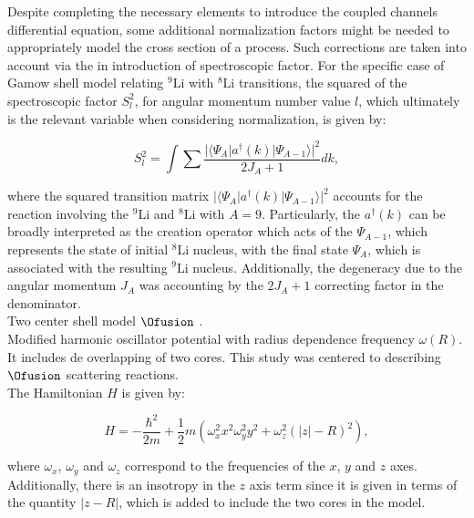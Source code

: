 \documentclass[openany]{book}
\begin{document}
Despite completing the necessary elements to introduce the coupled channels differential equation, some additional normalization factors might be needed to appropriately model the cross section of a process. Such corrections are taken into account via the in introduction of spectroscopic factor. For the specific case of  Gamow shell model relating $\mathrm{{}^{9}Li}$ with $\mathrm{{}^{8}Li}$ transitions, the squared of the spectroscopic factor $S^2_{l}$, for angular momentum number value $l$,  which ultimately is the relevant variable when considering normalization, is given by:

\begin{equation}\label{eq:micro_shellGamow_spectroscopic}
	S^2_{l} = \int {\sum \frac{|\langle \Psi_A | a^{\dagger}(k)| \Psi_{A-1} \rangle |^2}{2J_A + 1}} dk,
\end{equation}

where the squared transition matrix $|\langle \Psi_A | a^{\dagger}(k)| \Psi_{A-1} \rangle |^2$ accounts for the reaction involving the $\mathrm{{}^{9}Li}$ and $\mathrm{{}^{8}Li}$ with $A = 9$. Particularly, the $a^{\dagger}(k)$ can be broadly interpreted as the creation operator which acts of the $\Psi_{A-1}$, which represents the state of initial $\mathrm{{}^{8}Li}$ nucleus, with the final state $\Psi_{A}$, which is associated with the resulting  $\mathrm{{}^{9}Li}$ nucleus. Additionally, the degeneracy due to the angular momentum $J_A$ was accounting by the $2J_A + 1 $  correcting factor in the denominator. \\


Two center shell model $\Ofusion$ \cite{tazawa_1974}. \\

Modified harmonic oscillator potential with radius dependence frequency $\omega(R)$. It includes de overlapping of two cores. This study was centered to describing $\Ofusion$ scattering reactions. \\

The Hamiltonian $H$ is given by: 

\begin{equation}\label{eq:micro_twoCenterShell_Hamltonian}
	H = -\frac{\hbar^2}{2m} + \frac{1}{2}m (\omega^2_x  x^2  \omega^2_y y^2 + \omega^2_z (|z| - R)^2),
\end{equation}

where $\omega_x$, $\omega_y$ and $\omega_z$ correspond to the frequencies of the $x$, $y$ and $z$ axes. Additionally, there is an insotropy in the $z$ axis term since it is given in terms of the quantity $|z-R|$, which is added to include the two cores in the model. \\
\end{document}
